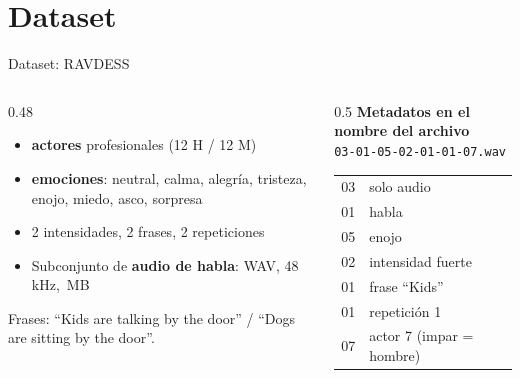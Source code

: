 \documentclass[aspectratio=169,11pt]{beamer}
\newcommand{\nota}[1]{{\small\color{tinta2}#1}}
\begin{document}
\section{Dataset}
\begin{frame}{Dataset: RAVDESS}
  \begin{columns}[T]
    \begin{column}{0.48\textwidth}
      \begin{itemize}
        \item \textbf{\nActores{} actores} profesionales (12 H / 12 M)
        \item \textbf{\nEmociones{} emociones}: neutral, calma, alegría, tristeza, enojo, miedo, asco,
              sorpresa
        \item 2 intensidades, 2 frases, 2 repeticiones
        \item Subconjunto de \textbf{audio de habla}: \nClips{} WAV, 48\,kHz, \tamanoMB\,MB
      \end{itemize}
      \vspace{0.4em}
      \nota{Frases: ``Kids are talking by the door'' / ``Dogs are sitting by the door''.}
    \end{column}
    \begin{column}{0.5\textwidth}
      \textbf{Metadatos en el nombre del archivo}\\[0.3em]
      \centering\texttt{03-01-05-02-01-01-07.wav}\\[0.4em]
      \footnotesize
      \begin{tabular}{@{}ll@{}}
        \toprule
        03 & solo audio \\
        01 & habla \\
        05 & enojo \\
        02 & intensidad fuerte \\
        01 & frase ``Kids'' \\
        01 & repetición 1 \\
        07 & actor 7 (impar = hombre) \\
        \bottomrule
      \end{tabular}
    \end{column}
  \end{columns}
\end{frame}
\end{document}
